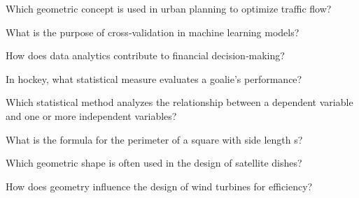\begin{enhancedmcq}{Which geometric concept is used in urban planning to optimize traffic flow?}
\end{enhancedmcq}

\begin{enhancedmcq}{What is the purpose of cross‑validation in machine learning models?}
\end{enhancedmcq}

\begin{enhancedmcq}{How does data analytics contribute to financial decision‑making?}
\end{enhancedmcq}

\begin{enhancedmcq}{In hockey, what statistical measure evaluates a goalie's performance?}
\end{enhancedmcq}

\begin{enhancedmcq}{Which statistical method analyzes the relationship between a dependent variable and one or more independent variables?}
\end{enhancedmcq}

\begin{enhancedmcq}{What is the formula for the perimeter of a square with side length s?}
\end{enhancedmcq}

\begin{enhancedmcq}{Which geometric shape is often used in the design of satellite dishes?}
\end{enhancedmcq}

\begin{enhancedmcq}{How does geometry influence the design of wind turbines for efficiency?}
\end{enhancedmcq}


